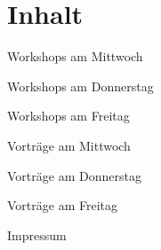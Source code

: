 \section*{Inhalt}
\label{contents}
\newlength\contentspace
\setlength\contentspace{0.2em}

\vspace*{\contentspace}%
\noindent Workshops am Mittwoch \dotfill \pageref{mittwoch-workshops}

\vspace*{\contentspace}%
\noindent Workshops am Donnerstag \dotfill \pageref{donnerstag-workshops}

\vspace*{\contentspace}%
\noindent Workshops am Freitag \dotfill \pageref{freitag-workshops}

\vspace*{\contentspace}%
\noindent Vorträge am Mittwoch \dotfill \pageref{mittwoch}

\vspace*{\contentspace}%
\noindent Vorträge am Donnerstag \dotfill \pageref{donnerstag}

\vspace*{\contentspace}%
\noindent Vorträge am Freitag \dotfill \pageref{freitag}

\vspace*{\contentspace}%
\noindent Impressum \dotfill \pageref{impressum}

\newpage
